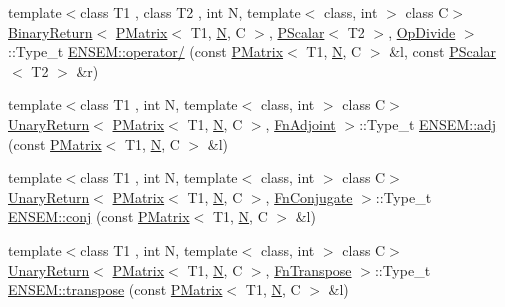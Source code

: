 \begin{DoxyCompactItemize}
\item 
{\footnotesize template$<$class T1 , class T2 , int N, template$<$ class, int $>$ class C$>$ }\\\mbox{\hyperlink{structENSEM_1_1BinaryReturn}{Binary\+Return}}$<$ \mbox{\hyperlink{classENSEM_1_1PMatrix}{P\+Matrix}}$<$ T1, \mbox{\hyperlink{operator__name__util_8cc_a7722c8ecbb62d99aee7ce68b1752f337}{N}}, C $>$, \mbox{\hyperlink{classENSEM_1_1PScalar}{P\+Scalar}}$<$ T2 $>$, \mbox{\hyperlink{structENSEM_1_1OpDivide}{Op\+Divide}} $>$\+::Type\+\_\+t \mbox{\hyperlink{group__primmatrix_ga1b00e76a765453dfbb33f0630bd863c3}{E\+N\+S\+E\+M\+::operator/}} (const \mbox{\hyperlink{classENSEM_1_1PMatrix}{P\+Matrix}}$<$ T1, \mbox{\hyperlink{operator__name__util_8cc_a7722c8ecbb62d99aee7ce68b1752f337}{N}}, C $>$ \&l, const \mbox{\hyperlink{classENSEM_1_1PScalar}{P\+Scalar}}$<$ T2 $>$ \&r)
\item 
{\footnotesize template$<$class T1 , int N, template$<$ class, int $>$ class C$>$ }\\\mbox{\hyperlink{structENSEM_1_1UnaryReturn}{Unary\+Return}}$<$ \mbox{\hyperlink{classENSEM_1_1PMatrix}{P\+Matrix}}$<$ T1, \mbox{\hyperlink{operator__name__util_8cc_a7722c8ecbb62d99aee7ce68b1752f337}{N}}, C $>$, \mbox{\hyperlink{structENSEM_1_1FnAdjoint}{Fn\+Adjoint}} $>$\+::Type\+\_\+t \mbox{\hyperlink{group__primmatrix_ga443bf356f8bca93ff78f16db721417b9}{E\+N\+S\+E\+M\+::adj}} (const \mbox{\hyperlink{classENSEM_1_1PMatrix}{P\+Matrix}}$<$ T1, \mbox{\hyperlink{operator__name__util_8cc_a7722c8ecbb62d99aee7ce68b1752f337}{N}}, C $>$ \&l)
\item 
{\footnotesize template$<$class T1 , int N, template$<$ class, int $>$ class C$>$ }\\\mbox{\hyperlink{structENSEM_1_1UnaryReturn}{Unary\+Return}}$<$ \mbox{\hyperlink{classENSEM_1_1PMatrix}{P\+Matrix}}$<$ T1, \mbox{\hyperlink{operator__name__util_8cc_a7722c8ecbb62d99aee7ce68b1752f337}{N}}, C $>$, \mbox{\hyperlink{structENSEM_1_1FnConjugate}{Fn\+Conjugate}} $>$\+::Type\+\_\+t \mbox{\hyperlink{group__primmatrix_gabbacb7d7e40fcf5d0bcd18aa907d33ea}{E\+N\+S\+E\+M\+::conj}} (const \mbox{\hyperlink{classENSEM_1_1PMatrix}{P\+Matrix}}$<$ T1, \mbox{\hyperlink{operator__name__util_8cc_a7722c8ecbb62d99aee7ce68b1752f337}{N}}, C $>$ \&l)
\item 
{\footnotesize template$<$class T1 , int N, template$<$ class, int $>$ class C$>$ }\\\mbox{\hyperlink{structENSEM_1_1UnaryReturn}{Unary\+Return}}$<$ \mbox{\hyperlink{classENSEM_1_1PMatrix}{P\+Matrix}}$<$ T1, \mbox{\hyperlink{operator__name__util_8cc_a7722c8ecbb62d99aee7ce68b1752f337}{N}}, C $>$, \mbox{\hyperlink{structENSEM_1_1FnTranspose}{Fn\+Transpose}} $>$\+::Type\+\_\+t \mbox{\hyperlink{group__primmatrix_gaffe281aeb23abb6d655321654f855e26}{E\+N\+S\+E\+M\+::transpose}} (const \mbox{\hyperlink{classENSEM_1_1PMatrix}{P\+Matrix}}$<$ T1, \mbox{\hyperlink{operator__name__util_8cc_a7722c8ecbb62d99aee7ce68b1752f337}{N}}, C $>$ \&l)

\end{DoxyCompactItemize}
